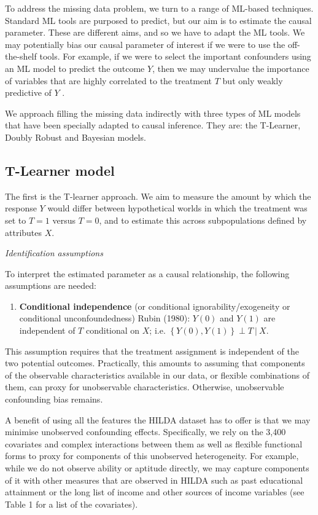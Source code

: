 \documentclass[12pt, a4paper]{article}
\begin{document}
To address the missing data problem, we turn to a range of ML-based techniques.
Standard ML tools are purposed to predict, but our aim is to estimate the
causal parameter. These are different aims, and so we have to adapt the ML
tools. We may potentially bias our causal parameter of interest if we were to
use the off-the-shelf tools. For example, if we were to select the important
confounders using an ML model to predict the outcome $Y$, then we may
undervalue the importance of variables that are highly correlated to the
treatment $T$ but only weakly predictive of $Y$ \citep{cherno2018}.

We approach filling the missing data indirectly with three types of ML models
that have been specially adapted to causal inference. They are: the T-Learner,
Doubly Robust and Bayesian models. 


\subsection{T-Learner model}

The first is the T-learner approach. We aim to measure the amount by which the
response $Y$ would differ between hypothetical worlds in which the treatment
was set to $T=1$ versus $T=0$, and to estimate this across subpopulations
defined by attributes $X$. 

\emph{Identification assumptions}

To interpret the estimated parameter as a causal relationship, the following assumptions are needed:

\begin{enumerate}
  \item \textbf{Conditional independence} (or conditional ignorability/exogeneity or conditional unconfoundedness) Rubin (1980): $Y(0)$ and $Y(1)$ are independent of $T$ conditional on $X$; i.e. $\left\{Y(0), Y(1)\right\} \perp T~|~X$.  
\end{enumerate}

This assumption requires that the treatment assignment is independent of the two potential outcomes. Practically, this amounts to assuming that components of the observable characteristics available in our data, or flexible combinations of them, can proxy for unobservable characteristics. Otherwise, unobservable confounding bias remains.

A benefit of using all the features the HILDA dataset has to offer is that we may minimise unobserved confounding effects. Specifically, we rely on the 3,400 covariates and complex interactions between them as well as flexible functional forms to proxy for components of this unobserved heterogeneity. For example, while we do not observe ability or aptitude directly, we may capture components of it with other measures that are observed in HILDA such as past educational attainment or the long list of income and other sources of income variables (see Table 1 for a list of the covariates). 
\end{document}

